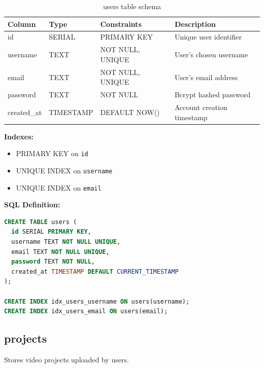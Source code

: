 \begin{table}[h]
\centering
\begin{tabular}{|l|l|l|p{5cm}|}
\hline
\textbf{Column} & \textbf{Type} & \textbf{Constraints} & \textbf{Description} \\
\hline
id & SERIAL & PRIMARY KEY & Unique user identifier \\
username & TEXT & NOT NULL, UNIQUE & User's chosen username \\
email & TEXT & NOT NULL, UNIQUE & User's email address \\
password & TEXT & NOT NULL & Bcrypt hashed password \\
created\_at & TIMESTAMP & DEFAULT NOW() & Account creation timestamp \\
\hline
\end{tabular}
\caption{users table schema}
\end{table}

\textbf{Indexes:}
\begin{itemize}
    \item PRIMARY KEY on \texttt{id}
    \item UNIQUE INDEX on \texttt{username}
    \item UNIQUE INDEX on \texttt{email}
\end{itemize}

\textbf{SQL Definition:}
\begin{lstlisting}[language=SQL]
CREATE TABLE users (
  id SERIAL PRIMARY KEY,
  username TEXT NOT NULL UNIQUE,
  email TEXT NOT NULL UNIQUE,
  password TEXT NOT NULL,
  created_at TIMESTAMP DEFAULT CURRENT_TIMESTAMP
);

CREATE INDEX idx_users_username ON users(username);
CREATE INDEX idx_users_email ON users(email);
\end{lstlisting}

\subsection{projects}

Stores video projects uploaded by users.

